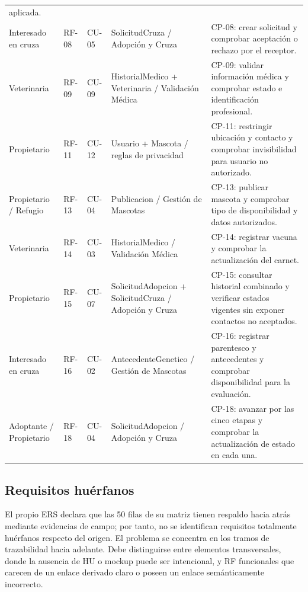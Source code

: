 \documentclass[journal,onecolumn]{IEEEtran}
\begin{document}
\begin{longtable}{L{2.6cm} L{1.2cm} L{2.0cm} L{3.6cm} L{4.1cm}}
		aplicada. \\
		Interesado en cruza & RF-08 & CU-05 & SolicitudCruza / Adopción y Cruza &
		CP-08: crear solicitud y comprobar aceptación o rechazo por el receptor. \\
		Veterinaria & RF-09 & CU-09 & HistorialMedico + Veterinaria / Validación Médica &
		CP-09: validar información médica y comprobar estado e identificación profesional. \\
		Propietario & RF-11 & CU-12 & Usuario + Mascota / reglas de privacidad &
		CP-11: restringir ubicación y contacto y comprobar invisibilidad para usuario no
		autorizado. \\
		Propietario / Refugio & RF-13 & CU-04 & Publicacion / Gestión de Mascotas &
		CP-13: publicar mascota y comprobar tipo de disponibilidad y datos autorizados. \\
		Veterinaria & RF-14 & CU-03 & HistorialMedico / Validación Médica &
		CP-14: registrar vacuna y comprobar la actualización del carnet. \\
		Propietario & RF-15 & CU-07 & SolicitudAdopcion + SolicitudCruza / Adopción y Cruza &
		CP-15: consultar historial combinado y verificar estados vigentes sin exponer contactos no
		aceptados. \\
		Interesado en cruza & RF-16 & CU-02 & AntecedenteGenetico / Gestión de Mascotas &
		CP-16: registrar parentesco y antecedentes y comprobar disponibilidad para la evaluación. \\
		Adoptante / Propietario & RF-18 & CU-04 & SolicitudAdopcion / Adopción y Cruza &
		CP-18: avanzar por las cinco etapas y comprobar la actualización de estado en cada una. \\
	\end{longtable}
	
	\subsection{Requisitos huérfanos}
	\label{sec:huerfanos}
	
	El propio ERS declara que las 50 filas de su matriz tienen respaldo hacia atrás mediante
	evidencias de campo; por tanto, no se identifican requisitos totalmente huérfanos respecto del
	origen. El problema se concentra en los tramos de trazabilidad hacia adelante. Debe distinguirse
	entre elementos transversales, donde la ausencia de HU o mockup puede ser intencional, y RF
	funcionales que carecen de un enlace derivado claro o poseen un enlace semánticamente incorrecto.
	
\end{document}
